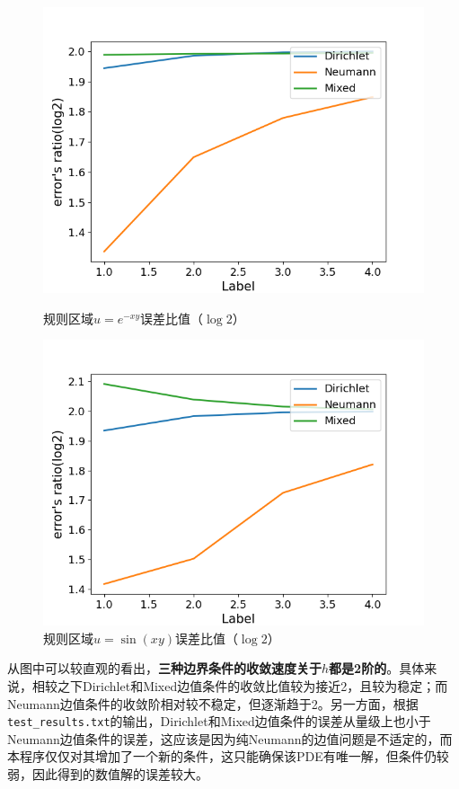 \documentclass{ctexart}
\begin{document}
\begin{sloppypar}
\begin{figure}[H]
  \begin{minipage}[t]{0.5\linewidth}
    \centering
    \includegraphics[scale = 0.5]{f2_PE.png}
    \caption{规则区域$u=e^{-xy}$误差比值（$\log 2$）}
  \end{minipage}
  \begin{minipage}[t]{0.5\linewidth}
    \centering
    \includegraphics[scale = 0.5]{f3_PE.png}
    \caption{规则区域$u=\sin(xy)$误差比值（$\log 2$）}
  \end{minipage}
  \label{fig2}
\end{figure}
从图中可以较直观的看出，\textbf{三种边界条件的收敛速度关于$h$都是2阶的}。具体来说，相较之下Dirichlet和Mixed边值条件的收敛比值较为接近2，且较为稳定；而Neumann边值条件的收敛阶相对较不稳定，但逐渐趋于2。另一方面，根据\verb|test_results.txt|的输出，Dirichlet和Mixed边值条件的误差从量级上也小于Neumann边值条件的误差，这应该是因为纯Neumann的边值问题是不适定的，而本程序仅仅对其增加了一个新的条件，这只能确保该PDE有唯一解，但条件仍较弱，因此得到的数值解的误差较大。


\end{sloppypar}
\end{document}

